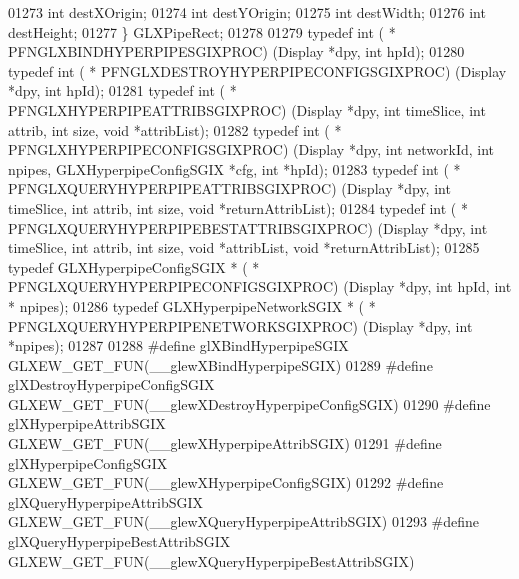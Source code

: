 \begin{DoxyCode}
01273   \textcolor{keywordtype}{int} destXOrigin; 
01274   \textcolor{keywordtype}{int} destYOrigin; 
01275   \textcolor{keywordtype}{int} destWidth; 
01276   \textcolor{keywordtype}{int} destHeight; 
01277 \} GLXPipeRect;
01278 
01279 \textcolor{keyword}{typedef} int ( * PFNGLXBINDHYPERPIPESGIXPROC) (Display *dpy, \textcolor{keywordtype}{int} hpId);
01280 \textcolor{keyword}{typedef} int ( * PFNGLXDESTROYHYPERPIPECONFIGSGIXPROC) (Display *dpy, \textcolor{keywordtype}{int} hpId);
01281 \textcolor{keyword}{typedef} int ( * PFNGLXHYPERPIPEATTRIBSGIXPROC) (Display *dpy, \textcolor{keywordtype}{int} timeSlice, \textcolor{keywordtype}{int} attrib, \textcolor{keywordtype}{int} 
      size, \textcolor{keywordtype}{void} *attribList);
01282 \textcolor{keyword}{typedef} int ( * PFNGLXHYPERPIPECONFIGSGIXPROC) (Display *dpy, \textcolor{keywordtype}{int} networkId, \textcolor{keywordtype}{int} npipes, 
      GLXHyperpipeConfigSGIX *cfg, \textcolor{keywordtype}{int} *hpId);
01283 \textcolor{keyword}{typedef} int ( * PFNGLXQUERYHYPERPIPEATTRIBSGIXPROC) (Display *dpy, \textcolor{keywordtype}{int} timeSlice, \textcolor{keywordtype}{int} attrib, \textcolor{keywordtype}{int} 
      size, \textcolor{keywordtype}{void} *returnAttribList);
01284 \textcolor{keyword}{typedef} int ( * PFNGLXQUERYHYPERPIPEBESTATTRIBSGIXPROC) (Display *dpy, \textcolor{keywordtype}{int} timeSlice, \textcolor{keywordtype}{int} attrib, \textcolor{keywordtype}{int} 
      size, \textcolor{keywordtype}{void} *attribList, \textcolor{keywordtype}{void} *returnAttribList);
01285 \textcolor{keyword}{typedef} GLXHyperpipeConfigSGIX * ( * PFNGLXQUERYHYPERPIPECONFIGSGIXPROC) (Display *dpy, \textcolor{keywordtype}{int} hpId, \textcolor{keywordtype}{int} *
      npipes);
01286 \textcolor{keyword}{typedef} GLXHyperpipeNetworkSGIX * ( * PFNGLXQUERYHYPERPIPENETWORKSGIXPROC) (Display *dpy, \textcolor{keywordtype}{int} *npipes);
01287 
01288 \textcolor{preprocessor}{#define glXBindHyperpipeSGIX GLXEW\_GET\_FUN(\_\_glewXBindHyperpipeSGIX)}
01289 \textcolor{preprocessor}{#define glXDestroyHyperpipeConfigSGIX GLXEW\_GET\_FUN(\_\_glewXDestroyHyperpipeConfigSGIX)}
01290 \textcolor{preprocessor}{#define glXHyperpipeAttribSGIX GLXEW\_GET\_FUN(\_\_glewXHyperpipeAttribSGIX)}
01291 \textcolor{preprocessor}{#define glXHyperpipeConfigSGIX GLXEW\_GET\_FUN(\_\_glewXHyperpipeConfigSGIX)}
01292 \textcolor{preprocessor}{#define glXQueryHyperpipeAttribSGIX GLXEW\_GET\_FUN(\_\_glewXQueryHyperpipeAttribSGIX)}
01293 \textcolor{preprocessor}{#define glXQueryHyperpipeBestAttribSGIX GLXEW\_GET\_FUN(\_\_glewXQueryHyperpipeBestAttribSGIX)}

\end{DoxyCode}
